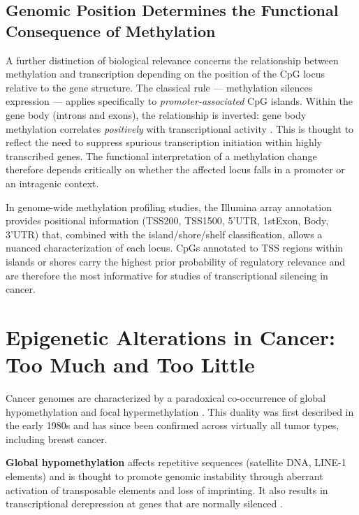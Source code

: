 \subsection{Genomic Position Determines the Functional Consequence of Methylation}

A further distinction of biological relevance concerns the relationship between
methylation and transcription depending on the position of the CpG locus relative
to the gene structure. The classical rule — methylation silences expression — applies
specifically to \textit{promoter-associated} CpG islands. Within the gene body
(introns and exons), the relationship is inverted: gene body methylation correlates
\textit{positively} with transcriptional activity \cite{Jones2012}. This is thought
to reflect the need to suppress spurious transcription initiation within highly
transcribed genes. The functional interpretation of a methylation change therefore
depends critically on whether the affected locus falls in a promoter or an
intragenic context.

In genome-wide methylation profiling studies, the Illumina array annotation
provides positional information (TSS200, TSS1500, 5'UTR, 1stExon, Body, 3'UTR)
that, combined with the island/shore/shelf classification, allows a nuanced
characterization of each locus. CpGs annotated to TSS regions within islands or
shores carry the highest prior probability of regulatory relevance and are therefore
the most informative for studies of transcriptional silencing in cancer.

\section{Epigenetic Alterations in Cancer: Too Much and Too Little}

Cancer genomes are characterized by a paradoxical co-occurrence of global
hypomethylation and focal hypermethylation \cite{ehrlich2002}. This duality was
first described in the early 1980s and has since been confirmed across virtually
all tumor types, including breast cancer.

\textbf{Global hypomethylation} affects repetitive sequences (satellite DNA,
LINE-1 elements) and is thought to promote genomic instability through aberrant
activation of transposable elements and loss of imprinting. It also results in
transcriptional derepression at genes that are normally silenced \cite{ehrlich2002}.

